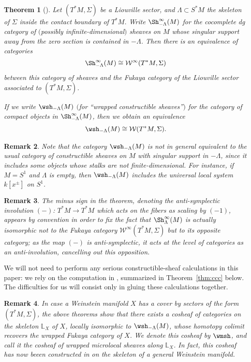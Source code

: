 \documentclass[pdftex]{sigma}%
\numberwithin{equation}{section}
\newtheorem{Theorem}{Theorem}[section]
\newtheorem{Remark}[Theorem]{Remark} }
\def\LL{\mathbb{L}}
\def\cW{\mathcal{W}}
\begin{document}
\begin{Theorem}[{\cite[Theorem 1.1]{GPS3}}]%
 Let $(T^*M, \Sigma)$ be a Liouville sector, and $\Lambda\subset S^*M$ the skeleton of $\Sigma$ inside the contact boundary of $T^*M$. Write $\Sh^\infty_{-\Lambda}(M)$ for the cocomplete dg category of $($possibly infinite-dimensional$)$ sheaves on $M$ whose singular support away from the zero section is contained in $-\Lambda$. Then there is an equivalence of categories
 \[
 \Sh^\infty_{-\Lambda}(M) \cong \cW^\infty(T^*M,\Sigma)
 \]
 between this category of sheaves and the Fukaya category of the Liouville sector associated to $(T^*M,\Sigma)$.

 If we write $\wsh_{-\Lambda}(M)$ $($for ``wrapped constructible sheaves''$)$ for the category of compact objects in $\Sh^\infty_{-\Lambda}(M)$, then we obtain an equivalence
 \[
 \wsh_{-\Lambda}(M) \cong \cW(T^*M,\Sigma).
 \]
\end{Theorem}
\begin{Remark}
 Note that the category $\wsh_{-\Lambda}(M)$ is not in general equivalent to the usual category of constructible sheaves on $M$ with singular support in $-\Lambda$, since it includes some objects whose stalks are not finite-dimensional. For instance, if $M=S^1$ and $\Lambda$ is empty, then $\wsh_{-\Lambda}(M)$ includes the universal local system $k[x^\pm]$ on $S^1$.
\end{Remark}
\begin{Remark}
	The minus sign in the theorem, denoting the anti-symplectic involution $(-)$: $T^*M\to T^*M$ which acts on the fibers as scaling by $(-1)$, appears by convention in order to fix the fact that $\Sh_{\Lambda}^\infty(M)$ is actually isomorphic not to the Fukaya category $\cW^\infty(T^*M,\Sigma)$ but to its {\em opposite} category; as the map $(-)$ is anti-symplectic, it acts at the level of categories as an anti-involution, cancelling out this opposition.
\end{Remark}

We will not need to perform any serious constructible-sheaf calculations in this paper: we rely on the computation in \cite{Ku}, summarized in Theorem~\ref{thm:ccc} below. The difficulties for us will consist only in gluing these calculations together.

\begin{Remark}
 In case a Weinstein manifold $X$ has a cover by sectors of the form $(T^*M,\Sigma)$, the above theorems show that there exists a cosheaf of categories on the skeleton $\LL_X$ of $X$, locally isomorphic to $\wsh_{-\Lambda}(M)$, whose homotopy colimit recovers the wrapped Fukaya category of $X$. We denote this cosheaf by $\wmsh$, and call it the cosheaf of {\em wrapped microlocal sheaves} along $\LL_X$. In fact, this cosheaf has now beeen constructed in \cite{NS20} on the skeleton of a general Weinstein manifold.
\end{Remark}
\end{document}
